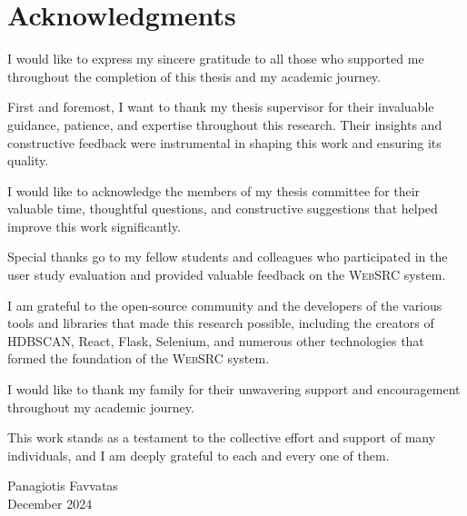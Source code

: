 \documentclass[12pt,a4paper,oneside]{book}
\newcommand{\name}{\textsc{WebSRC}}
\begin{document}
\chapter*{Acknowledgments}

I would like to express my sincere gratitude to all those who supported me throughout the completion of this thesis and my academic journey.

First and foremost, I want to thank my thesis supervisor for their invaluable guidance, patience, and expertise throughout this research. Their insights and constructive feedback were instrumental in shaping this work and ensuring its quality.

I would like to acknowledge the members of my thesis committee for their valuable time, thoughtful questions, and constructive suggestions that helped improve this work significantly.

Special thanks go to my fellow students and colleagues who participated in the user study evaluation and provided valuable feedback on the {\name} system.

I am grateful to the open-source community and the developers of the various tools and libraries that made this research possible, including the creators of HDBSCAN, React, Flask, Selenium, and numerous other technologies that formed the foundation of the {\name} system.

I would like to thank my family for their unwavering support and encouragement throughout my academic journey.

This work stands as a testament to the collective effort and support of many individuals, and I am deeply grateful to each and every one of them.

\vspace{1cm}
\noindent Panagiotis Favvatas \\
December 2024

\tableofcontents
\listoffigures
\listoftables

\mainmatter
\pagestyle{fancy}








\appendix





\end{document}
